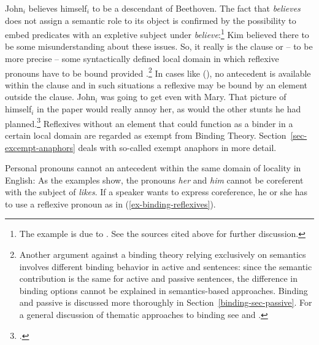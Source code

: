 \documentclass[output=paper
 	        ,biblatex
                ,babelshorthands
                ,newtxmath
                ,draftmode
                ,colorlinks, citecolor=brown
]{langscibook}
\begin{document}
\ea
John$_i$ believes himself$_i$ to be a descendant of Beethoven.
\z
The fact that \emph{believes} does not assign a semantic role to its object is confirmed by the
possibility to embed predicates with an expletive subject under \emph{believe}:\footnote{%
The example is due to \citet[]{ps2}. See the sources cited above for further discussion.
}
\ea
Kim believed there to be some misunderstanding about these issues.
\z
So, it really is the clause or -- to be more precise -- some syntactically defined local domain in
which reflexive pronouns have to be bound provided .\footnote{%
Another argument against a binding theory relying exclusively on semantics involves different binding
behavior in active and  sentences: since the semantic contribution is the same for active
and passive sentences, the difference in binding options cannot be explained in semantics-based
approaches. Binding and passive is discussed more thoroughly in Section~\ref{binding-sec-passive}. 
For a general discussion of
thematic approaches to binding see  and .
}
In cases like (), no antecedent is available within the clause and in such situations a
reflexive may be bound by an element outside the clause.
\eanoraggedright
John$_i$ was going to get even with Mary. That picture of himself$_i$
in the paper would really annoy her, as would the other stunts he had planned.\footnote{
        .
}
\z
Reflexives without an element that could function as a binder in a certain local domain are regarded
as exempt from Binding Theory. Section~\ref{sec-excempt-anaphors} deals with so-called exempt anaphors in more detail.

Personal pronouns cannot  an antecedent within the same domain of locality in English:
\eal
{}
\zl
As the examples show, the pronouns \emph{her} and \emph{him} cannot be coreferent with the subject
of \emph{likes}. If a speaker wants to express coreference, he or she has to use a reflexive pronoun
as in (\ref{ex-binding-reflexives}). 
\end{document}
